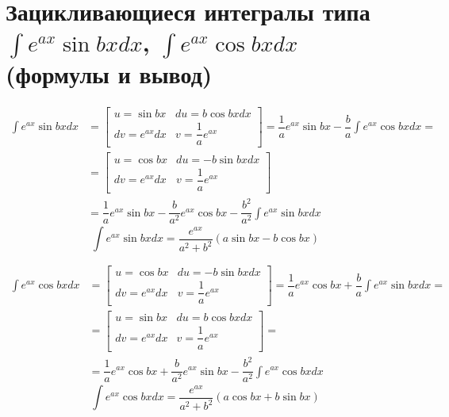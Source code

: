 \documentclass[12pt]{article}
\begin{document}
\section{Зацикливающиеся интегралы типа $\int e^{ax}\sin{bx}dx$, $\int e^{ax}\cos{bx}dx$ (формулы и вывод)}
\[
    \begin{aligned}
        \int e^{ax}\sin{bx}dx & =
        \left[\begin{array}{ll}
                      u = \sin{bx}  & du = b\cos{bx}dx       \\
                      dv = e^{ax}dx & v = \dfrac{1}{a}e^{ax}
                  \end{array}\right]
        = \dfrac{1}{a}e^{ax}\sin{bx} - \dfrac{b}{a}\int e^{ax}\cos{bx}dx =                                                           \\
                              & =
        \left[\begin{array}{ll}
                      u = \cos{bx}  & du = -b\sin{bx}dx      \\
                      dv = e^{ax}dx & v = \dfrac{1}{a}e^{ax}
                  \end{array}\right]                                                                                 \\
                              & = \dfrac{1}{a}e^{ax}\sin{bx} - \dfrac{b}{a^2}e^{ax}\cos{bx} - \dfrac{b^2}{a^2} \int e^{ax}\sin{bx}dx
    \end{aligned}
\]
\[
    \int{e^{ax}\sin{bx}dx} = \dfrac{e^{ax}}{a^2 + b^2}\left(a\sin{bx} - b\cos{bx}\right)
\]

\[
    \begin{aligned}
        \int e^{ax}\cos{bx}dx & =
        \left[\begin{array}{ll}
                      u = \cos{bx}  & du = -b\sin{bx}dx      \\
                      dv = e^{ax}dx & v = \dfrac{1}{a}e^{ax}
                  \end{array}\right]
        = \dfrac{1}{a}e^{ax}\cos{bx} + \dfrac{b}{a}\int e^{ax}\sin{bx}dx =                                                           \\
                              & =
        \left[\begin{array}{ll}
                      u = \sin{bx}  & du = b\cos{bx}dx       \\
                      dv = e^{ax}dx & v = \dfrac{1}{a}e^{ax}
                  \end{array}\right] =                                                                                 \\
                              & = \dfrac{1}{a}e^{ax}\cos{bx} + \dfrac{b}{a^2}e^{ax}\sin{bx} - \dfrac{b^2}{a^2} \int e^{ax}\cos{bx}dx
    \end{aligned}
\]
\[
    \int{e^{ax}\cos{bx}dx} = \dfrac{e^{ax}}{a^2 + b^2}\left(a\cos{bx} + b\sin{bx}\right)
\]
\end{document}
